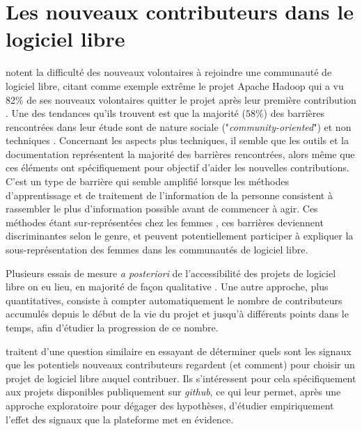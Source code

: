 \documentclass[dvipsnames]{llncs}
\newcommand{\en}[1]{\foreignlanguage{english}{\emph{#1}}}
\begin{document}
    \section{Les nouveaux contributeurs dans le logiciel libre}

    \textcite{barriers-2018} notent la difficulté des nouveaux volontaires à rejoindre une communauté de
    logiciel libre, citant comme exemple extrême le projet Apache Hadoop qui a vu 82\% de ses nouveaux
    volontaires quitter le projet après leur première contribution \parencite{hadoop-dropout-2013}. Une des
    tendances qu'ils trouvent est que la majorité ($58\%$) des barrières rencontrées dans leur étude sont de
    nature sociale ("\en{community-oriented}") et non techniques \parencite[p.~1008]{barriers-2018}.
    Concernant les aspects plus techniques, il semble que les outils et la documentation représentent la
    majorité des barrières rencontrées, alors même que ces éléments ont spécifiquement pour objectif d'aider
    les nouvelles contributions. C'est un type de barrière qui semble amplifié lorsque les méthodes
    d'apprentissage et de traitement de l'information de la personne consistent à rassembler le plus
    d'information possible avant de commencer à agir. Ces méthodes étant sur-représentées chez les femmes
    \parencite{gender-information-processing-1995,gender-information-processing-2015}, ces barrières
    deviennent discriminantes selon le genre, et peuvent potentiellement participer à expliquer la
    sous-représentation des femmes dans les communautés de logiciel libre.

    \label{sec:accessibility-measure}
    Plusieurs essais de mesure \emph{a posteriori} de l'accessibilité des projets de logiciel libre on eu
    lieu, en majorité de façon qualitative
    \parencites{newcomers-accessibility-2016}{newcomers-onboarding-2018}[voir
    aussi][]{newcomers-adaptation-2005}. Une autre approche, plus quantitatives, consiste à compter
    automatiquement le nombre de contributeurs accumulés depuis le début de la vie du projet et jusqu'à
    différents points dans le temps, afin d'étudier la progression de ce nombre\cite{contributor-count-2006}.

    \textcite{signals-2019} traitent d'une question similaire en essayant de déterminer quels sont les signaux
    que les potentiels nouveaux contributeurs regardent (et comment) pour choisir un projet de logiciel libre
    auquel contribuer. Ils s'intéressent pour cela spécifiquement aux projets disponibles publiquement sur
    \en{github}, ce qui leur permet, après une approche exploratoire pour dégager des hypothèses, d'étudier
    empiriquement l'effet des signaux que la plateforme met en évidence.
\end{document}
